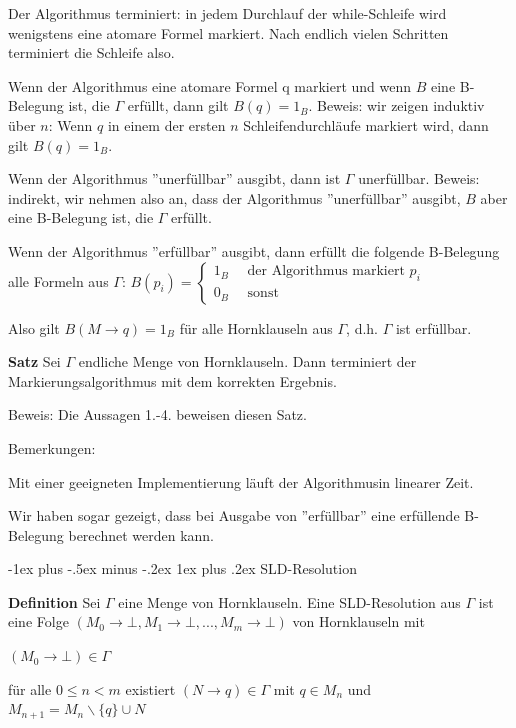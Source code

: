 \documentclass[a4paper]{article}
\makeatletter
\renewcommand{\note}[2]{\begin{noteBox} \textbf{#1} #2 \end{noteBox}}
\renewcommand{\subsubsection}{\@startsection{subsubsection}{3}{0mm}%
                {-1ex plus -.5ex minus -.2ex}%
                {1ex plus .2ex}%
                {\normalfont\small\bfseries}}
\makeatother
\begin{document}
\begin{multicols}{3}
  \begin{enumerate*}
    \item Der Algorithmus terminiert: in jedem Durchlauf der while-Schleife wird wenigstens eine atomare Formel markiert. Nach endlich vielen Schritten terminiert die Schleife also.
    \item Wenn der Algorithmus eine atomare Formel q markiert und wenn $B$ eine B-Belegung ist, die $\Gamma$ erfüllt, dann gilt $B(q) = 1_B$.
    Beweis: wir zeigen induktiv über $n$: Wenn $q$ in einem der ersten $n$ Schleifendurchläufe markiert wird, dann gilt $B(q) = 1_B$.
    \item Wenn der Algorithmus ''unerfüllbar'' ausgibt, dann ist $\Gamma$ unerfüllbar.
    Beweis: indirekt, wir nehmen also an, dass der Algorithmus ''unerfüllbar'' ausgibt, $B$ aber eine B-Belegung ist, die $\Gamma$ erfüllt.
    \item Wenn der Algorithmus ''erfüllbar'' ausgibt, dann erfüllt die folgende B-Belegung alle Formeln aus $\Gamma$:
    $B(p_i)=\begin{cases} 1_B \quad\text{ der Algorithmus markiert } p_i \\ 0_B \quad\text{ sonst} \end{cases}$
    \item Also gilt $B(M\rightarrow q) = 1_B$ für alle Hornklauseln aus $\Gamma$, d.h. $\Gamma$ ist erfüllbar.
  \end{enumerate*}

  \note{Satz}{Sei $\Gamma$ endliche Menge von Hornklauseln. Dann terminiert der Markierungsalgorithmus mit dem korrekten Ergebnis.}

  Beweis: Die Aussagen 1.-4. beweisen diesen Satz.

  Bemerkungen:
  \begin{itemize*}
    \item Mit einer geeigneten Implementierung läuft der Algorithmusin linearer Zeit.
    \item Wir haben sogar gezeigt, dass bei Ausgabe von ''erfüllbar'' eine erfüllende B-Belegung berechnet werden kann.
  \end{itemize*}

  \subsubsection{SLD-Resolution}
  \note{Definition}{Sei $\Gamma$ eine Menge von Hornklauseln. Eine SLD-Resolution aus $\Gamma$ ist eine Folge $(M_0\rightarrow\bot,M_1\rightarrow\bot,... ,M_m\rightarrow\bot)$ von Hornklauseln mit
    \begin{itemize*}
      \item $(M_0\rightarrow\bot)\in\Gamma$
      \item für alle $0\leq n<m$ existiert $(N\rightarrow q)\in\Gamma$ mit $q\in M_n$ und $M_{n+1} = M_n\backslash\{q\}\cup N$
    \end{itemize*}
  }


\end{multicols}
\end{document}
